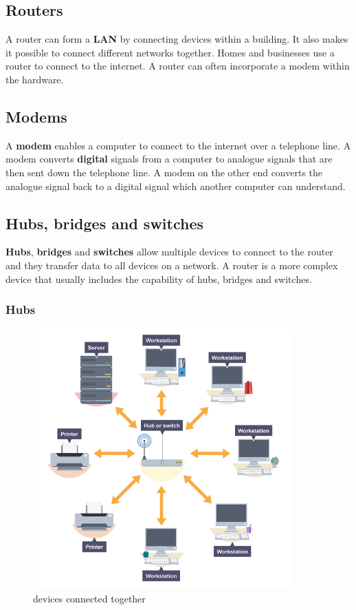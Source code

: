 \documentclass[a4paper,12pt]{book}
\begin{document}
\subsection{Routers}
A router can form a \textbf{LAN} by connecting devices within a building. It also makes it possible to connect different networks together. Homes and businesses use a router to connect to the internet. A router can often incorporate a modem within the hardware.

\subsection{Modems}
A \textbf{modem} enables a computer to connect to the internet over a telephone line. A modem converts \textbf{digital} signals from a computer to analogue signals that are then sent down the telephone line. A modem on the other end converts the analogue signal back to a digital signal which another computer can understand.

\subsection{Hubs, bridges and switches}
\textbf{Hubs}, \textbf{bridges} and \textbf{switches} allow multiple devices to connect to the router and they transfer data to all devices on a network. A router is a more complex device that usually includes the capability of hubs, bridges and switches.

\clearpage

\subsubsection{Hubs}

\begin{figure}
\centering
\includegraphics[width=10cm]{./hbs.PNG}
\caption{devices connected together}\label{wrap-fig:5}
\end{figure}
\end{document}

